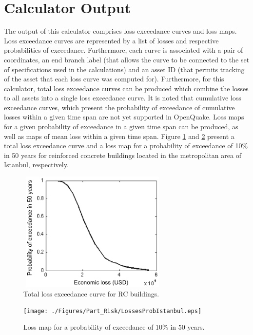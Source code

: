 \section{Calculator Output}
The output of this calculator comprises loss exceedance curves and loss maps. Loss exceedance curves are represented by a list of losses and respective probabilities of exceedance. Furthermore, each curve is associated with a pair of coordinates, an end branch label (that allows the curve to be connected to the set of specifications used in the calculations) and an asset ID (that permits tracking of the asset that each loss curve was computed for). Furthermore, for this calculator, total loss exceedance curves can be produced which combine the losses to all assets into a single loss exceedance curve.  It is noted that cumulative loss exceedance curves, which present the probability of exceedance of cumulative losses within a given time span are not yet supported in OpenQuake. Loss maps for a given probability of exceedance in a given time span can be produced, as well as maps of mean loss within a given time span. Figure \ref{fig:LossCurve} and \ref{fig:ProbLosses} present a total loss exceedance curve and a loss map for a probability of exceedance of 10\% in 50 years for reinforced concrete buildings located in the metropolitan area of Istanbul, respectively. 
\begin{figure}[ht]
\centering
\includegraphics[width=7.5cm,height=6cm]{./Figures/Part_Risk/LossCurveIstanbul.eps} 
\caption{Total loss exceedance curve for RC buildings.}
\label{fig:LossCurve}
\end{figure} 
 \begin{figure}[ht]
\centering
\texttt{[image: ./Figures/Part\_Risk/LossesProbIstanbul.eps]}
\caption{Loss map for a probability of exceedance of 10\% in 50 years.}
\label{fig:ProbLosses}
\end{figure} 

